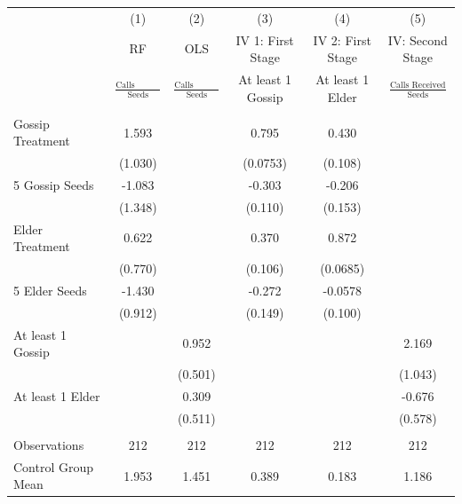\begin{tabular}{lccccc} \hline
 & (1) & (2) & (3) & (4) & (5) \\
 & RF & OLS & IV 1: First Stage & IV 2: First Stage & IV: Second Stage \\
 & $\frac{\mbox{Calls Received}}{\mbox{Seeds}}$ & $\frac{\mbox{Calls Received}}{\mbox{Seeds}}$ & At least 1 Gossip & At least 1 Elder & $\frac{\mbox{Calls Received}}{\mbox{Seeds}}$ \\ \hline
 &  &  &  &  &  \\
Gossip Treatment & 1.593 &  & 0.795 & 0.430 &  \\
 & (1.030) &  & (0.0753) & (0.108) &  \\
5 Gossip Seeds & -1.083 &  & -0.303 & -0.206 &  \\
 & (1.348) &  & (0.110) & (0.153) &  \\
Elder Treatment & 0.622 &  & 0.370 & 0.872 &  \\
 & (0.770) &  & (0.106) & (0.0685) &  \\
5 Elder Seeds & -1.430 &  & -0.272 & -0.0578 &  \\
 & (0.912) &  & (0.149) & (0.100) &  \\
At least 1 Gossip &  & 0.952 &  &  & 2.169 \\
 &  & (0.501) &  &  & (1.043) \\
At least 1 Elder &  & 0.309 &  &  & -0.676 \\
 &  & (0.511) &  &  & (0.578) \\
 &  &  &  &  &  \\
Observations & 212 & 212 & 212 & 212 & 212 \\
 Control Group Mean & 1.953 & 1.451 & 0.389 & 0.183 & 1.186 \\ \hline
\end{tabular}
